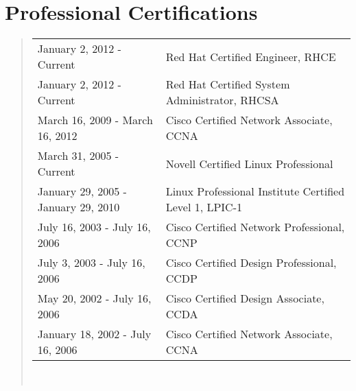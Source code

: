 \section*{Professional Certifications}
\begin{quote}
\begin{tabular}{l l}
January 2, 2012 - Current & Red Hat Certified Engineer, RHCE\\
January 2, 2012 - Current & Red Hat Certified System Administrator, RHCSA\\
March 16, 2009 - March 16, 2012 & Cisco Certified Network Associate, CCNA\\
March 31, 2005 - Current & Novell Certified Linux Professional\\
January 29, 2005 - January 29, 2010 & Linux Professional Institute Certified Level 1, LPIC-1\\
July 16, 2003 - July 16, 2006 & Cisco Certified Network Professional, CCNP\\
July 3, 2003 - July 16, 2006 & Cisco Certified Design Professional, CCDP\\
May 20, 2002 - July 16, 2006 & Cisco Certified Design Associate, CCDA\\
January 18, 2002 - July 16, 2006 & Cisco Certified Network Associate, CCNA\\
\end{tabular}\\
\end{quote}

